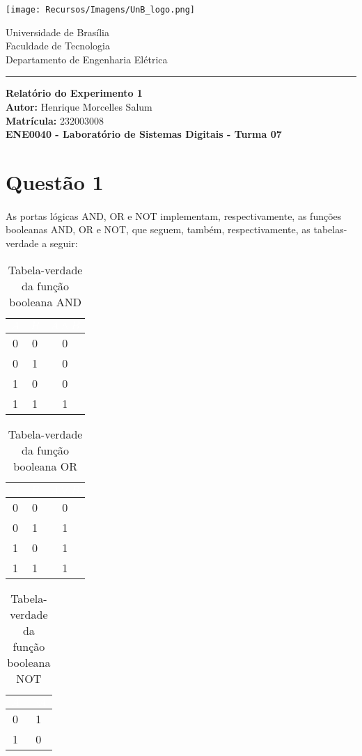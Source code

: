 \documentclass[a4paper, 12pt]{article}
\newcommand{\capa}{
    \begin{titlepage}
        \begin{multicols}{2}
            \begin{flushleft}
                \texttt{[image: Recursos/Imagens/UnB\_logo.png]}
            \end{flushleft}
            \columnbreak
            \begin{flushright}
                Universidade de Brasília \\
                Faculdade de Tecnologia \\
                Departamento de Engenharia Elétrica
            \end{flushright}
        \end{multicols}
        \begin{center}
        \vspace{-20pt}
        \rule{\textwidth}{0.4pt}
        \end{center}
        \vspace{0.6cm}
        \begin{center}
            {\Huge \textbf{Relatório do Experimento 1}} \\[1em]
            {\large \textbf{Autor:} Henrique Morcelles Salum} \\[0.5em]
            {\large \textbf{Matrícula:} 232003008} \\
            \vfill
            {\large \textbf{ENE0040 - Laboratório de Sistemas Digitais - Turma 07}} \\
        \end{center}
    \end{titlepage}
}
\begin{document}
\capa

\newpage
\tableofcontents
\newpage

\section{Questão 1}
\paragraph{}
As portas lógicas AND, OR e NOT implementam, respectivamente, as funções booleanas AND, OR e NOT, que seguem, também, respectivamente, as tabelas-verdade a seguir:

\begin{table}[H]
    \centering
    \begin{tabular}{|c|c|c|}
        \hline
        \rowcolor{black}
        \textcolor{white}{$A$} & \textcolor{white}{$B$} & \textcolor{white}{$A \land B$} \\ \hline
        0 & 0 & 0 \\ \hline
        \rowcolor{lightgray}
        0 & 1 & 0 \\ \hline
        1 & 0 & 0 \\ \hline
        \rowcolor{lightgray}
        1 & 1 & 1 \\ \hline
    \end{tabular}
    \caption{Tabela-verdade da função booleana AND}
\end{table}

\begin{table}[H]
    \centering
    \begin{tabular}{|c|c|c|}
        \hline
        \rowcolor{black}
        \textcolor{white}{$A$} & \textcolor{white}{$B$} & \textcolor{white}{$A \lor B$} \\ \hline
        0 & 0 & 0 \\ \hline
        \rowcolor{lightgray}
        0 & 1 & 1 \\ \hline
        1 & 0 & 1 \\ \hline
        \rowcolor{lightgray}
        1 & 1 & 1 \\ \hline
    \end{tabular}
    \caption{Tabela-verdade da função booleana OR}
\end{table}

\begin{table}[H]
    \centering
    \begin{tabular}{|c|c|}
        \hline
        \rowcolor{black}
        \textcolor{white}{$A$} & \textcolor{white}{$\neg A$} \\ \hline
        0 & 1 \\ \hline
        \rowcolor{lightgray}
        1 & 0 \\ \hline
    \end{tabular}
    \caption{Tabela-verdade da função booleana NOT}
\end{table}
\end{document}
